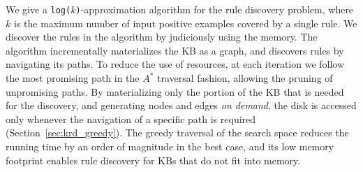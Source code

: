 \vspace{0.5ex}
We give a \texttt{log($k$)}-approximation algorithm for the rule discovery problem, %
where $k$ is the maximum number of input positive examples covered by a single rule. We discover the rules in the algorithm by judiciously using the memory. The algorithm incrementally 
materializes the KB as a graph, and discovers rules by navigating its paths. To reduce the use of resources, at each iteration we follow the most promising path in the $A^*$ traversal fashion, allowing the pruning of unpromising paths.	
By materializing only the portion of the KB that is needed for the discovery, and generating nodes and edges \emph{on demand}, the disk is accessed only whenever the navigation of a specific path is required (Section~\ref{sec:krd_greedy}). 
The greedy traversal of the search space reduces the running time by an order of magnitude in the best case, and its low memory footprint enables rule discovery for KBs that do not fit into memory.



